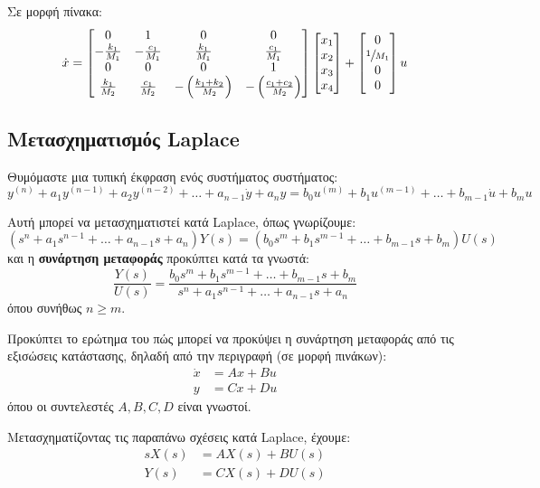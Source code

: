 \documentclass[11pt,a4paper,notitlepage,fleqn]{article}
\begin{document}
\begin{exercise}
	Σε μορφή πίνακα:
	\[
	\dot x = \left[\begin{matrix}
	0 & 1 & 0 & 0\\
	-\frac{k_1}{M_1} & -\frac{c_1}{M_1} & \frac{k_1}{M_1} & \frac{c_1}{M_1}\\
	0 & 0 & 0 & 1\\
	\frac{k_1}{M_2} & \frac{c_1}{M_2} & -\left(\frac{k_1+k_2}{M_2}\right)
	& -\left(\frac{c_1+c_2}{M_2}\right)
	\end{matrix}\right]\left[\begin{matrix}
	x_1 \\ x_2 \\ x_3 \\ x_4
	\end{matrix}\right] + \left[
	\begin{matrix}
	0 \\ \sfrac{1}{M_1} \\ 0 \\ 0
	\end{matrix}
	\right]u
	\]
\end{exercise}

\subsection{Μετασχηματισμός Laplace}
Θυμόμαστε μια τυπική έκφραση ενός συστήματος συστήματος:
\[
y^{(n)} + a_1y^{(n-1)} + a_2y^{(n-2)} + \dots + a_{n-1}\dot y + a_n y =
b_0 u^{(m)} + b_1u^{(m-1)} + \dots + b_{m-1}\dot u + b_m u
\]

Αυτή μπορεί να μετασχηματιστεί κατά Laplace, όπως γνωρίζουμε:
\[
\left(
s^n + a_1s^{n-1} + \dots + a_{n-1}s + a_n
\right)Y(s) = \left(
b_0s^m + b_1s^{m-1} + \dots + b_{m-1}s+b_m
\right)U(s)
\]
και η \textbf{συνάρτηση μεταφοράς} προκύπτει κατά τα γνωστά:
\[
\frac{Y(s)}{U(s)} = \frac{
	b_0s^m + b_1s^{m-1} + \dots + b_{m-1}s+b_m
	}{
	s^n + a_1s^{n-1} + \dots + a_{n-1}s + a_n
	}
\] όπου συνήθως \( n \geq m \).

Προκύπτει το ερώτημα του πώς μπορεί να προκύψει η συνάρτηση μεταφοράς από τις εξισώσεις
κατάστασης, δηλαδή από την περιγραφή (σε μορφή πινάκων):
\begin{align*}
\dot x &= Ax	+ Bu\\
y &= Cx + Du
\end{align*}
όπου οι συντελεστές \( A,B,C,D \) είναι γνωστοί.

Μετασχηματίζοντας τις παραπάνω σχέσεις κατά Laplace, έχουμε:
\begin{align*}
	sX(s) &= AX(s) + BU(s) \\
	Y(s) &= CX(s) + DU(s)
\end{align*}
\end{document}
